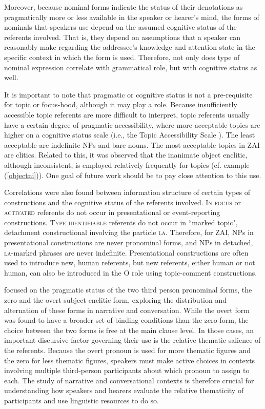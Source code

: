 Moreover, because nominal forms indicate the status of their denotations as pragmatically more or less available in the speaker or hearer's mind, the forms of nominals that speakers use depend on the assumed cognitive status of the referents involved. That is, they depend on assumptions that a speaker can reasonably make regarding the addressee's knowledge and attention state in the specific context in which the form is used. Therefore, not only does type of nominal expression correlate with grammatical role, but with cognitive status as well. 

It is important to note that pragmatic or cognitive status is not a pre-requisite for topic or focus-hood, although it may play a role. Because insufficiently accessible topic referents are more difficult to interpret, topic referents usually have a certain degree of pragmatic accessibility, where more acceptable topics are higher on a cognitive status scale (i.e., the Topic Accessibility Scale \citep{lambrecht1994}). The least acceptable are indefinite NPs and bare nouns. The most acceptable topics in ZAI are clitics. Related to this, it was observed that the inanimate object enclitic, although inconsistent, is employed relatively frequently for topics (cf. example (\ref{objectni})). One goal of future work should be to pay close attention to this use.

Correlations were also found between information structure of certain types of constructions and the cognitive status of the referents involved. \textsc{In focus} \citep{gundel1993} or \textsc{activated} referents do not occur in presentational or event-reporting constructions. \textsc{Type identifiable} referents do not occur in ``marked topic", detachment constructional involving the particle \textsc{la}. Therefore, for ZAI, NPs in presentational constructions are never pronominal forms, and NPs in detached, \textsc{la}-marked phrases are never indefinite. Presentational constructions are often used to introduce new, human referents, but new referents, either human or not human, can also be introduced in the O role using topic-comment constructions.

 focused on the pragmatic status of the two third person pronominal forms, the zero and the overt subject enclitic form, exploring the distribution and alternation of these forms in narrative and conversation. While the overt form was found to have a broader set of binding conditions than the zero form, the choice between the two forms is free at the main clause level. In those cases, an important discursive factor governing their use is the relative thematic salience of the referents. Because the overt pronoun is used for more thematic figures and the zero for less thematic figures, speakers must make active choices in contexts involving multiple third-person participants about which pronoun to assign to each. The study of narrative and conversational contexts is therefore crucial for understanding how speakers and hearers evaluate the relative thematicity of participants and use linguistic resources to do so.

